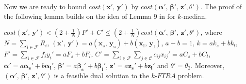 \documentclass[10pt]{llncs}
\begin{document}
Now we are ready to bound $cost\left(\boldsymbol{x'},\,\boldsymbol{y'}\right)$
by $cost\left(\boldsymbol{\alpha'},\,\boldsymbol{\beta'},\,\boldsymbol{z'},\theta'\right)$.
The proof of the following lemma builds on the idea of Lemma 9 in
\cite{jain01approximation} for $k$-median.
\begin{lemma}
\textup{$cost\left(\boldsymbol{x'},\,\boldsymbol{y'}\right)<\left(2+\frac{1}{N}\right)F'+C'\leq\left(2+\frac{1}{N}\right)cost\left(\boldsymbol{\alpha'},\,\boldsymbol{\beta'},\,\boldsymbol{z'},\theta'\right)$,}
where $N=\sum_{i\in\mathcal{F}}R_{i}$,\textup{ $\left(\boldsymbol{x'},\,\boldsymbol{y'}\right)=a\left(\boldsymbol{x_{s}},\,\boldsymbol{y_{s}}\right)+b\left(\boldsymbol{x_{l}},\,\boldsymbol{y_{l}}\right)$,
$a+b=1,\, k=ak_{s}+bk_{l},$ $F'=\sum_{i\in\mathcal{F}}f_{i}y_{i}'=aF_{s}+bF_{l}$,
$C'=\sum_{i\in\mathcal{F}}\sum_{j\in\mathcal{C}}c_{ij}x_{ij}'=aC_{s}+bC_{l}$},
$\boldsymbol{\alpha'}=a\boldsymbol{\alpha_{s}'}+b\boldsymbol{\alpha_{l}'}$,
$\boldsymbol{\beta'}=a\boldsymbol{\beta_{s}'}+b\boldsymbol{\beta_{l}'}$,
$\boldsymbol{z'}=a\boldsymbol{z_{s}'}+b\boldsymbol{z_{l}'}$ and $\theta'=\theta_{2}$.
Moreover, $\left(\boldsymbol{\alpha'},\,\boldsymbol{\beta'},\,\boldsymbol{z'},\theta'\right)$
is a feasible dual solution to the $k$-$FTRA$ problem.\label{lem:1bound}\end{lemma}
\end{document}
